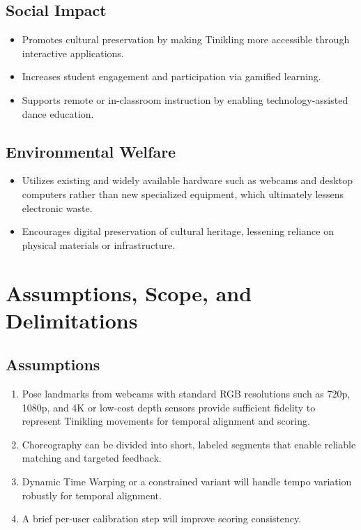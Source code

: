 \subsection{Social Impact}
\begin{itemize}
  \item Promotes cultural preservation by making Tinikling more accessible through interactive applications.
  \item Increases student engagement and participation via gamified learning.
  \item Supports remote or in-classroom instruction by enabling technology-assisted dance education.
\end{itemize}

\subsection{Environmental Welfare}
\begin{itemize}
  \item Utilizes existing and widely available hardware such as webcams and desktop computers rather than new specialized equipment, which ultimately lessens electronic waste.
  \item Encourages digital preservation of cultural heritage, lessening reliance on physical materials or infrastructure.
\end{itemize}

\section{Assumptions, Scope, and Delimitations}

\subsection{Assumptions}
\begin{enumerate}
\item Pose landmarks from webcams with standard RGB resolutions such as 720p, 1080p, and 4K or low-cost depth sensors provide sufficient fidelity to represent Tinikling movements for temporal alignment and scoring.
\item Choreography can be divided into short, labeled segments that enable reliable matching and targeted feedback.
\item Dynamic Time Warping or a constrained variant will handle tempo variation robustly for temporal alignment.
\item A brief per-user calibration step will improve scoring consistency.
\end{enumerate}

